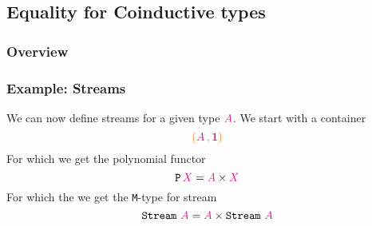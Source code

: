 \documentclass[xelatex,mathserif,serif,notheorems]{beamer} %
\theoremstyle{plain} %
\theoremstyle{definition}
\theoremstyle{remark}
\newcommand*{\term}[1]{\textcolor{green!30!black}{#1}} %
\newcommand*{\type}[1]{\textcolor{magenta!90!black}{#1}}
\newcommand*{\containerpair}[2]{\ensuremath{\colorlet{savedleftcolor}{.}\color{orange}\left(\color{savedleftcolor}#1\,\textcolor{orange}{\mathbf{,}}\,#2\color{orange}\right)\color{savedleftcolor}}}
\newcommand*{\unit}{\type{\textbf{1}}}
\newcommand*{\function}[1]{\textcolor{blue!60!black}{\ensuremath{\mathtt{#1}}}}
\newcommand*{\destructor}[1]{\textcolor{yellow!60!black}{\ensuremath{\mathtt{#1}}}}
\newcommand*{\typeformer}[1]{\ensuremath{\mathtt{#1}}}
\newcommand*{\functor}[1]{\ensuremath{\mathbf{\mathtt{#1}}}}
\begin{document}

\subsection{Equality for Coinductive types}
\begin{frame}
  \frametitle{Overview}
  \tableofcontents[currentsubsection]
\end{frame}

\begin{frame}[fragile]
  \frametitle{Example: Streams}
  We can now define streams for a given type \(\type{A}\). We start with a container
  \begin{equation}
    \containerpair{\type{A}}{\unit}
  \end{equation}
  For which we get the polynomial functor
  \begin{equation}
    \functor{P}\,\type{X} = \type{A} \times \type{X}
  \end{equation}
  For which the we get the \texttt{M}-type for stream
  \begin{equation}
    \typeformer{Stream}~\type{A} = \type{A} \times \typeformer{Stream}~\type{A}
  \end{equation}
  \begin{figure}[h]
    \centering
  \end{figure}
\end{frame}
\end{document}

